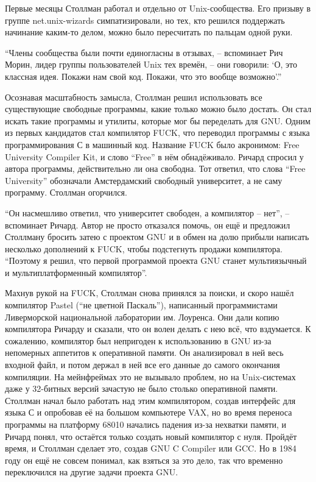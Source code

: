 Первые месяцы Столлман работал и отдельно от Unix-сообщества. Его призыву в группе net.unix-wizards симпатизировали, но тех, кто решился поддержать начинание каким-то делом, можно было пересчитать по пальцам одной руки.

\enquote{Члены сообщества были почти единогласны в отзывах, -- вспоминает Рич Морин, лидер группы пользователей Unix тех времён, -- они говорили: \enquote{О, это классная идея. Покажи нам свой код. Покажи, что это вообще возможно}.\hspace{0.01in}}

Осознавая масштабность замысла, Столлман решил использовать все существующие свободные программы, какие только можно было достать. Он стал искать такие программы и утилиты, которые мог бы переделать для GNU. Одним из первых кандидатов стал компилятор FUCK, что переводил программы с языка программирования С в машинный код. Название FUCK было акронимом: Free University Compiler Kit, и слово \enquote{Free} в нём обнадёживало. Ричард спросил у автора программы, действительно ли она свободна. Тот ответил, что слова \enquote{Free University} обозначали Амстердамский свободный университет, а не саму программу. Столлман огорчился.

\enquote{Он насмешливо ответил, что университет свободен, а компилятор -- нет}, -- вспоминает Ричард. Автор не просто отказался помочь, он ещё и предложил Столлману бросить затею с проектом GNU и в обмен на долю прибыли написать несколько дополнений к FUCK, чтобы подстегнуть продажи компилятора. \enquote{Поэтому я решил, что первой программой проекта GNU станет мультиязычный и мультиплатформенный компилятор}.

Махнув рукой на FUCK, Столлман снова принялся за поиски, и скоро нашёл компилятор Pastel (\enquote{не цветной Паскаль}), написанный программистами Ливерморской национальной лаборатории им. Лоуренса. Они дали копию компилятора Ричарду и сказали, что он волен делать с нею всё, что вздумается. К сожалению, компилятор был непригоден к использованию в GNU из-за непомерных аппетитов к оперативной памяти. Он анализировал в ней весь входной файл, и потом держал в ней все его данные до самого окончания компиляции. На мейнфреймах это не вызывало проблем, но на Unix-системах даже у 32-битных версий зачастую не было столько оперативной памяти. Столлман начал было работать над этим компилятором, создав интерфейс для языка С и опробовав её на большом компьютере VAX, но во время переноса программы на платформу 68010 начались падения из-за нехватки памяти, и Ричард понял, что остаётся только создать новый компилятор с нуля. Пройдёт время, и Столлман сделает это, создав GNU C Compiler или GCC. Но в 1984 году он ещё не совсем понимал, как взяться за это дело, так что временно переключился на другие задачи проекта GNU.

